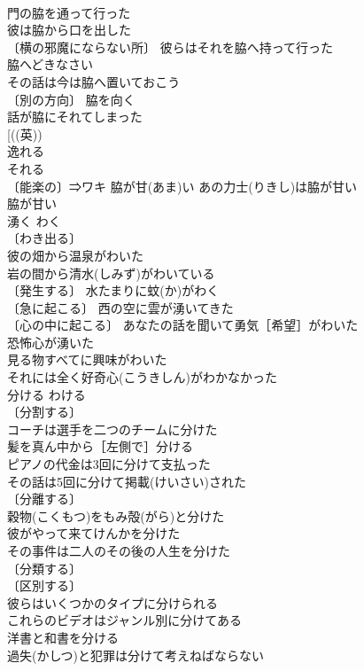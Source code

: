\documentclass[8pt]{extreport}
\begin{document}
\begin{CJK}{UTF8}{min}
\\	門の脇を通って行った 
\\	彼は脇から口を出した 
\\	〔横の邪魔にならない所〕 彼らはそれを脇へ持って行った 
\\	脇へどきなさい 
\\	その話は今は脇へ置いておこう 
\\	〔別の方向〕 脇を向く 
\\	話が脇にそれてしまった 
\\	[((英))
\\	逸れる 
\\	それる　
\\	〔能楽の〕⇒ワキ 脇が甘(あま)い あの力士(りきし)は脇が甘い 
\\	脇が甘い 
\\	湧く	わく	
\\	〔わき出る〕
\\	彼の畑から温泉がわいた 
\\	岩の間から清水(しみず)がわいている 
\\	〔発生する〕 水たまりに蚊(か)がわく 
\\	〔急に起こる〕 西の空に雲が湧いてきた 
\\	〔心の中に起こる〕 あなたの話を聞いて勇気［希望］がわいた 
\\	恐怖心が湧いた 
\\	見る物すべてに興味がわいた 
\\	それには全く好奇心(こうきしん)がわかなかった 
\\	分ける	わける	
\\	〔分割する〕
\\	コーチは選手を二つのチームに分けた 
\\	髪を真ん中から［左側で］分ける 
\\	ピアノの代金は3回に分けて支払った 
\\	その話は5回に分けて掲載(けいさい)された 
\\	〔分離する〕
\\	穀物(こくもつ)をもみ殻(がら)と分けた 
\\	彼がやって来てけんかを分けた 
\\	その事件は二人のその後の人生を分けた 
\\	〔分類する〕
\\	〔区別する〕
\\	彼らはいくつかのタイプに分けられる 
\\	これらのビデオはジャンル別に分けてある 
\\	洋書と和書を分ける 
\\	過失(かしつ)と犯罪は分けて考えねばならない 

\end{CJK}
\end{document}
